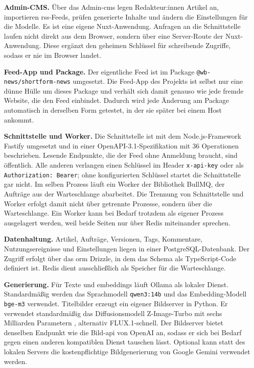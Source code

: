 \textbf{Admin-CMS.}
Über das Admin-\gls{cms} legen Redakteur:innen Artikel an, importieren \gls{rss}-Feeds, prüfen generierte Inhalte und ändern die Einstellungen für die Modelle.
Es ist eine eigene Nuxt-Anwendung.
Anfragen an die Schnittstelle laufen nicht direkt aus dem Browser, sondern über eine Server-Route der Nuxt-Anwendung.
Diese ergänzt den geheimen Schlüssel für schreibende Zugriffe, sodass er nie im Browser landet.

\textbf{Feed-App und Package.}
Der eigentliche Feed ist im Package \texttt{@wb-news/\allowbreak shortform-news} umgesetzt.
Die Feed-App des Projekts ist selbst nur eine dünne Hülle um dieses Package und verhält sich damit genauso wie jede fremde Website, die den Feed einbindet.
Dadurch wird jede Änderung am Package automatisch in derselben Form getestet, in der sie später bei einem Host ankommt.

\textbf{Schnittstelle und Worker.}
Die Schnittstelle ist mit dem Node.js-Framework Fastify umgesetzt und in einer OpenAPI-3.1-Spezifikation mit 36 Operationen beschrieben.
Lesende Endpunkte, die der Feed ohne Anmeldung braucht, sind öffentlich.
Alle anderen verlangen einen Schlüssel im Header \texttt{x-api-key} oder als \texttt{Authorization: Bearer}; ohne konfigurierten Schlüssel startet die Schnittstelle gar nicht.
Im selben Prozess läuft ein Worker der Bibliothek BullMQ, der Aufträge aus der Warteschlange abarbeitet.
Die Trennung von Schnittstelle und Worker erfolgt damit nicht über getrennte Prozesse, sondern über die Warteschlange.
Ein Worker kann bei Bedarf trotzdem als eigener Prozess ausgelagert werden, weil beide Seiten nur über Redis miteinander sprechen.

\textbf{Datenhaltung.}
Artikel, Aufträge, Versionen, Tags, Kommentare, Nutzungsereignisse und Einstellungen liegen in einer PostgreSQL-Datenbank.
Der Zugriff erfolgt über das \gls{orm} Drizzle, in dem das Schema als TypeScript-Code definiert ist.
Redis dient ausschließlich als Speicher für die Warteschlange.

\textbf{Generierung.}
Für Texte und \glspl{embedding} läuft Ollama als lokaler Dienst.
Standardmäßig werden das Sprachmodell \texttt{qwen3:14b} \cite{qwen2025qwen3} und das Embedding-Modell \texttt{bge-m3} \cite{chen2024bgem3} verwendet.
Titelbilder erzeugt ein eigener Bildserver in Python.
Er verwendet standardmäßig das Diffusionsmodell Z-Image-Turbo mit sechs Milliarden Parametern \cite{zimage2025}, alternativ FLUX.1-schnell.
Der Bildserver bietet denselben Endpunkt wie die Bild-\gls{api} von OpenAI an, sodass er sich bei Bedarf gegen einen anderen kompatiblen Dienst tauschen lässt.
Optional kann statt des lokalen Servers die kostenpflichtige Bildgenerierung von Google Gemini verwendet werden.

